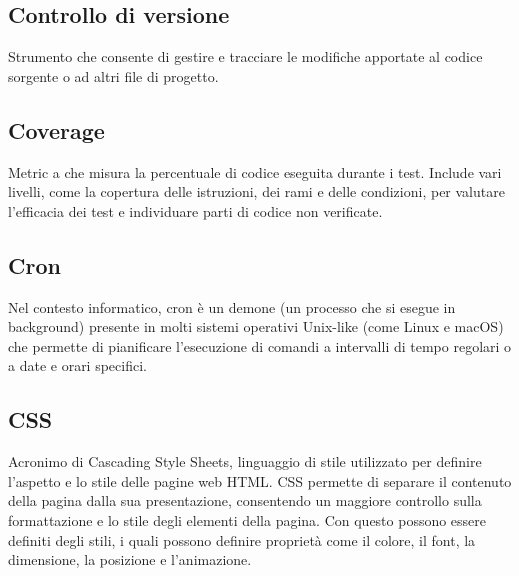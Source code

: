 \hypertarget{sec:controllo_versione}{}
\subsection*{Controllo di versione}
Strumento che consente di gestire e tracciare le modifiche apportate al codice sorgente o ad altri file di progetto.

\hypertarget{sec:coverage}{}
\subsection*{Coverage}
Metric a che misura la percentuale di codice eseguita durante i test. Include vari livelli, come la copertura delle istruzioni, dei rami e delle condizioni, per valutare l’efficacia dei test e individuare parti di codice non verificate.


\hypertarget{sec:cron}{}
\subsection*{Cron}
Nel contesto informatico, cron è un demone (un processo che si esegue in background) presente in molti sistemi operativi Unix-like 
(come Linux e macOS) che permette di pianificare l'esecuzione di comandi a intervalli di tempo regolari o a date e orari specifici.

\hypertarget{sec:css}{}
\subsection*{CSS}
Acronimo di Cascading Style Sheets, linguaggio di stile utilizzato per definire l’aspetto e lo stile delle pagine web HTML. CSS 
permette di separare il contenuto della pagina dalla sua presentazione, consentendo un maggiore controllo sulla formattazione e lo 
stile degli elementi della pagina. Con questo possono essere definiti degli stili, i quali possono definire proprietà come il colore, 
il font, la dimensione, la posizione e l’animazione.

\newpage